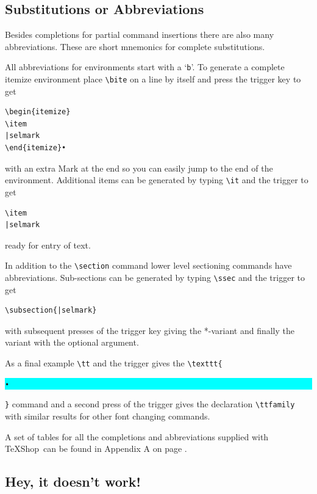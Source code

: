 \documentclass[letterpaper,11pt]{article}
\newcommand{\TS}{\textsf{\TeX Shop}}
\newcommand{\cmd}[1]{\textsf{#1}}
\newcommand{\selmark}{\colorbox{cyan}{\rule[-0.5ex]{0ex}{2.1ex}\texttt{•}}}
\begin{document}
\subsection{Substitutions or Abbreviations}

Besides completions for partial command insertions there are also many abbreviations. These are short mnemonics for complete substitutions. 

All abbreviations for environments start with a `\texttt{b}'. To generate a complete \cmd{itemize} environment place \verb|\bite| on a line by itself and press the trigger key to get
\begin{verbatim}
\begin{itemize}
\item
|selmark
\end{itemize}•
\end{verbatim}
with an extra Mark at the end so you can easily jump to the end of the environment. Additional items can be generated by typing \verb|\it| and the trigger to get
\begin{verbatim}
\item
|selmark
\end{verbatim}
ready for entry of text.

In addition to the \verb|\section| command lower level sectioning commands have abbreviations. Sub-sections can be generated by typing \verb|\ssec| and the trigger to get
\begin{verbatim}
\subsection{|selmark}
\end{verbatim}
with subsequent presses of the trigger key giving the *-variant and finally the variant with the optional argument.

As a final example \verb|\tt| and the trigger gives the \verb|\texttt{|\selmark\verb|}| command and a second press of the trigger gives the declaration \verb|\ttfamily| with similar results for other font changing commands.

A set of tables for all the completions and abbreviations supplied with \TS\ can be found in Appendix A on page \pageref{sec:CCTables}.
\subsection{Hey, it doesn't work!}
\end{document}
